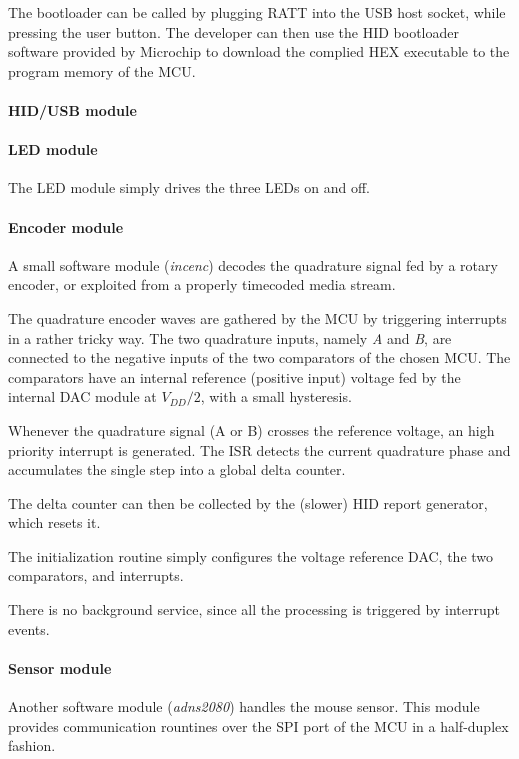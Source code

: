 \documentclass[a4paper,10pt]{article}
\begin{document}
\begin{multicols}{2}
The bootloader can be called by plugging RATT into the USB host socket, while
pressing the user button. The developer can then use the HID bootloader
software provided by Microchip to download the complied HEX executable to the
program memory of the MCU.


\paragraph{HID/USB module}
\TODO


\paragraph{LED module}
The LED module simply drives the three LEDs on and off.


\paragraph{Encoder module}
A small software module (\emph{incenc}) decodes the quadrature signal fed by a
rotary encoder, or exploited from a properly timecoded media stream.

The quadrature encoder waves are gathered by the MCU by triggering interrupts
in a rather tricky way. The two quadrature inputs, namely \emph{A} and
\emph{B}, are connected to the negative inputs of the two comparators of the
chosen MCU. The comparators have an internal reference (positive input)
voltage fed by the internal DAC module at $V_{DD}/2$, with a small hysteresis.

Whenever the quadrature signal (A or B) crosses the reference voltage, an
high priority interrupt is generated. The ISR detects the current quadrature
phase and accumulates the single step into a global delta counter.

The delta counter can then be collected by the (slower) HID report generator,
which resets it.

The initialization routine simply configures the voltage reference DAC, the
two comparators, and interrupts.

There is no background service, since all the processing is triggered by
interrupt events.


\paragraph{Sensor module}
Another software module (\emph{adns2080}) handles the mouse sensor. This
module provides communication rountines over the SPI port of the MCU in a
half-duplex fashion.


\end{multicols}
\end{document}
